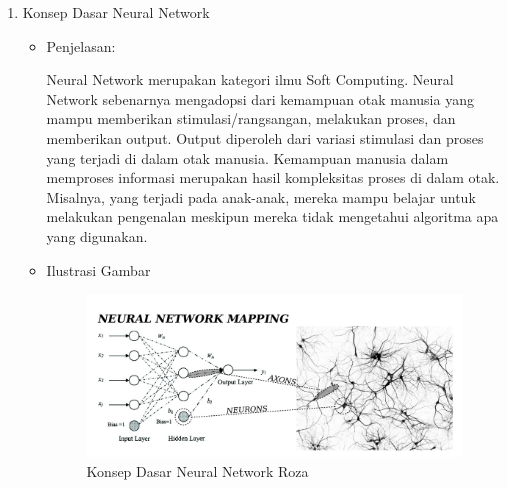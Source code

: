 \begin{enumerate}
\item Konsep Dasar Neural Network
\begin{itemize}
\item  Penjelasan:
\par Neural Network merupakan kategori ilmu Soft Computing. Neural Network sebenarnya mengadopsi dari kemampuan otak manusia yang mampu memberikan stimulasi/rangsangan, melakukan proses, dan memberikan output. Output diperoleh dari variasi stimulasi dan proses yang terjadi di dalam otak manusia. Kemampuan manusia dalam memproses informasi merupakan hasil kompleksitas proses di dalam otak. Misalnya, yang terjadi pada anak-anak, mereka mampu belajar untuk melakukan pengenalan meskipun mereka tidak mengetahui algoritma apa yang digunakan.
\par
\item Ilustrasi Gambar
\begin{figure}[!hbtp]
\centering
\includegraphics[scale=0.3]{figures/neuralroza.jpg}
\caption{Konsep Dasar Neural Network Roza}
\label{text-fadila}
\end{figure}
\par
\end{itemize}
\par
\par


\end{enumerate}
